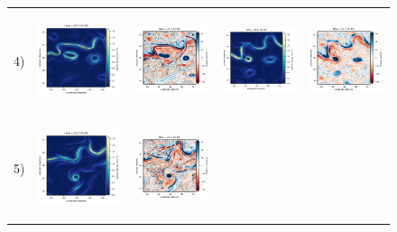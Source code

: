 \documentclass[draft]{agujournal2019}
\begin{document}
\begin{figure}[H]
\begin{center}
\begin{tabular}{ccccc}
\hspace{-10mm} 4) &
 \includegraphics[trim={0 13mm 22mm 5mm},clip, width=3.3cm,height=2.9cm]{figures/plots/natl60_train_ke.png} &
 \includegraphics[trim={13mm 13mm 22mm 5mm},clip, width=2.9cm,height=2.9cm]{figures/plots/natl60_train_vort_r.png} &
 \includegraphics[trim={13mm 13mm 22mm 5mm},clip, width=2.9cm,height=2.9cm]{figures/plots/natl60_rec_ke.png} &
 \includegraphics[trim={13mm 13mm 22mm 5mm},clip,width=2.9cm,height=2.9cm]{figures/plots/natl60_rec_vort_r.png} \\
\hspace{-10mm} 5) &
\includegraphics[trim={0 13mm 22mm 5mm},clip, width=3.3cm,height=2.9cm]{figures/plots/enatl60-t_train_ke.png} &
\includegraphics[trim={13mm 13mm 22mm 5mm},clip, width=2.9cm,height=2.9cm]{figures/plots/enatl60-t_train_vort_r.png} &

\end{tabular}
\end{center}
\end{figure}
\end{document}
